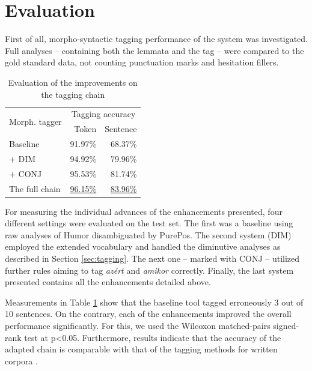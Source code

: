 \section{Evaluation}

First of all, morpho-syntactic tagging performance of the system was investigated. 
Full analyses -- containing both the lemmata and the tag -- were compared to the gold standard data, not counting punctuation marks and hesitation fillers.

\begin{table}[H]
\centering
\caption{Evaluation of the improvements on the tagging chain}
\label{tab:eval_tag}
\begin{tabular}{ l r r} 
\hline
\multicolumn{1}{l}{\multirow{2}{*}{Morph. tagger}} & \multicolumn{2}{c}{\hspace{0.8cm} Tagging accuracy} \\
& Token &  Sentence \\
\hline
Baseline &  \hspace{0.8cm} 91.97\%  & \hspace{0.8cm} 68.37\% \\
\hspace{0.2cm} + DIM &  94.92\% & 79.96\% \\
\hspace{0.2cm} + CONJ & 95.53\% & 81.74\% \\
The full chain & \underline{96.15\%} & \underline{83.96\%} \\

\hline
\end{tabular}
\end{table}

For measuring the individual advances of the enhancements presented, four different settings were evaluated on the test set. 
The first was a baseline using raw analyses of Humor disambiguated by PurePos. 
The second system (DIM) employed the extended vocabulary and handled the diminutive analyses as described in Section \ref{sec:tagging}. 
The next one -- marked with CONJ -- utilized further rules aiming to tag \textit{azért} and \textit{amikor} correctly. 
Finally, the last system presented contains all the enhancements detailed above.

Measurements in Table \ref{tab:eval_tag} show that the baseline tool tagged erroneously 3 out of 10 sentences. 
On the contrary, each of the enhancements improved the overall performance significantly.
For this, we used the Wilcoxon matched-pairs signed-rank test at p<0.05. 
Furthermore, results indicate that the accuracy of the adapted chain is comparable with that of the tagging methods for written corpora \cite{zsibrata2013magyarlanc}. 

